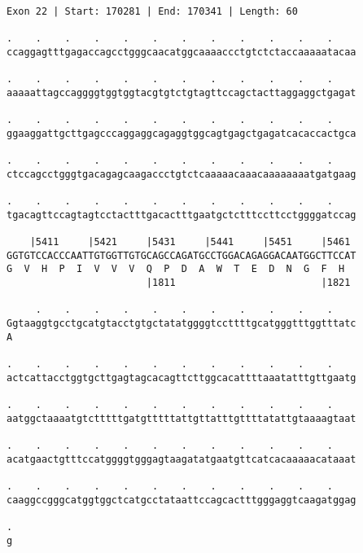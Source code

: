 \documentclass{article}
\begin{document}
\begin{Verbatim}[fontfamily=courier]
Exon 22 | Start: 170281 | End: 170341 | Length: 60

.    .    .    .    .    .    .    .    .    .    .    .    
ccaggagtttgagaccagcctgggcaacatggcaaaaccctgtctctaccaaaaatacaa

.    .    .    .    .    .    .    .    .    .    .    .    
aaaaattagccaggggtggtggtacgtgtctgtagttccagctacttaggaggctgagat

.    .    .    .    .    .    .    .    .    .    .    .    
ggaaggattgcttgagcccaggaggcagaggtggcagtgagctgagatcacaccactgca

.    .    .    .    .    .    .    .    .    .    .    .    
ctccagcctgggtgacagagcaagaccctgtctcaaaaacaaacaaaaaaaatgatgaag

.    .    .    .    .    .    .    .    .    .    .    .    
tgacagttccagtagtcctactttgacactttgaatgctctttccttcctggggatccag

    |5411     |5421     |5431     |5441     |5451     |5461 
GGTGTCCACCCAATTGTGGTTGTGCAGCCAGATGCCTGGACAGAGGACAATGGCTTCCAT
G  V  H  P  I  V  V  V  Q  P  D  A  W  T  E  D  N  G  F  H  
                        |1811                         |1821 

     .    .    .    .    .    .    .    .    .    .    .    
Ggtaaggtgcctgcatgtacctgtgctatatggggtccttttgcatgggtttggtttatc
A                                                           

.    .    .    .    .    .    .    .    .    .    .    .    
actcattacctggtgcttgagtagcacagttcttggcacattttaaatatttgttgaatg

.    .    .    .    .    .    .    .    .    .    .    .    
aatggctaaaatgtctttttgatgtttttattgttatttgttttatattgtaaaagtaat

.    .    .    .    .    .    .    .    .    .    .    .    
acatgaactgtttccatggggtgggagtaagatatgaatgttcatcacaaaaacataaat

.    .    .    .    .    .    .    .    .    .    .    .    
caaggccgggcatggtggctcatgcctataattccagcactttgggaggtcaagatggag

.
g
\end{Verbatim}
\newpage
\end{document}
